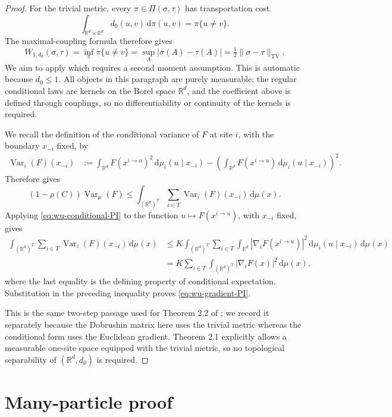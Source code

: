 \documentclass[12pt,reqno,letterpaper]{amsart}
\theoremstyle{definition}
\theoremstyle{remark}
\numberwithin{equation}{section}
\newcommand{\R}{\mathbb R}
\newcommand{\dd}{\,\mathrm d}
\newcommand{\Var}{\operatorname{Var}}
\newcommand{\TV}{\mathrm{TV}}
\begin{document}
\begin{proof}
For the trivial metric, every \(\pi\in\Pi(\sigma,\tau)\) has transportation
cost
\[
 \int_{\R^d\times\R^d}d_0(u,v)\dd\pi(u,v)=\pi\{u\ne v\}.
\]
The maximal-coupling formula therefore gives
\[
 W_{1,d_0}(\sigma,\tau)
 =\inf_\pi\pi\{u\ne v\}
 =\sup_A|\sigma(A)-\tau(A)|
 =\tfrac12\|\sigma-\tau\|_{\TV}.
\]
We aim to apply \cite[Theorem 2.1]{Wu} which requires a second moment assumption. This is automatic because \(d_0\le1\).  All
objects in this paragraph are purely measurable: the regular conditional laws are kernels on the Borel space \(\R^d\), and the coefficient above is
defined through couplings, so no differentiability or continuity of the
kernels is required.

We recall the definition of  the conditional variance of \(F\) at site \(i\), with
the boundary \(x_{-i}\) fixed, by
\begin{align*}
 \Var_i(F)(x_{-i})
 &:={}
 \int_{\R^d}F(x^{i\to u})^2\dd\mu_i(u\mid x_{-i})-
 \left(\int_{\R^d}F(x^{i\to u})\dd\mu_i(u\mid x_{-i})\right)^2.
\end{align*}
 Therefore \cite[Theorem 2.1, equation (2.4)]{Wu} gives
\begin{equation*}
 (1-\rho(C))\Var_\mu(F)
 \le\int_{(\R^d)^T}\sum_{i\in T}
 \Var_i(F)(x_{-i})\dd\mu(x).
\end{equation*}
Applying \eqref{eq:wu-conditional-PI} to the function
\(u\mapsto F(x^{i\to u})\), with \(x_{-i}\) fixed, gives
\begin{align*}
 \int_{(\R^d)^T}\sum_{i\in T}\Var_i(F)(x_{-i})\dd\mu(x)
 &\le K\int_{(\R^d)^T}\sum_{i\in T}\int_{\R^d}
   |\nabla_iF(x^{i\to u})|^2
   \dd\mu_i(u\mid x_{-i})\dd\mu(x)\\
 &=K\sum_{i\in T}\int_{(\R^d)^T}|\nabla_iF(x)|^2\dd\mu(x),
\end{align*}
where the last equality is the defining property of conditional
expectation.  Substitution in the preceding inequality proves
\eqref{eq:wu-gradient-PI}. 

This is the same two-step passage used for
Theorem 2.2 of \cite{Wu}; we record it separately because the Dobrushin
matrix here uses the trivial metric whereas the conditional form uses the
Euclidean gradient.  Theorem 2.1 explicitly allows a measurable one-site
space equipped with the trivial metric, so no topological separability of
\((\R^d,d_0)\) is required.
\end{proof}



\section{Many-particle proof}
\end{document}
